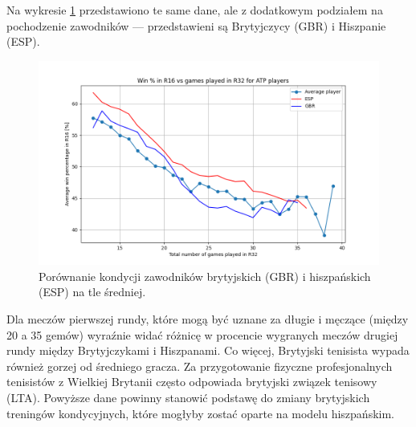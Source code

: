 \documentclass[12pt, a4paper]{article}
\begin{document}
Na wykresie \ref{fig:gbr_vs_esp} przedstawiono te same dane, ale z dodatkowym podziałem na pochodzenie zawodników --- przedstawieni są Brytyjczycy (GBR) i Hiszpanie (ESP).
\begin{figure}[h]
    \includegraphics[width=\textwidth]{figures/gbr_vs_esp.png}
    \caption{Porównanie kondycji zawodników brytyjskich (GBR) i hiszpańskich (ESP) na tle średniej.}
    \label{fig:gbr_vs_esp}
\end{figure}
Dla meczów pierwszej rundy, które mogą być uznane za długie i męczące (między 20 a 35 gemów) wyraźnie widać różnicę w procencie wygranych meczów drugiej rundy między Brytyjczykami i Hiszpanami. Co więcej, Brytyjski tenisista wypada również gorzej od średniego gracza. Za przygotowanie fizyczne profesjonalnych tenisistów z Wielkiej Brytanii często odpowiada brytyjski związek tenisowy (LTA). Powyższe dane powinny stanowić podstawę do zmiany brytyjskich treningów kondycyjnych, które mogłyby zostać oparte na modelu hiszpańskim.
\end{document}
